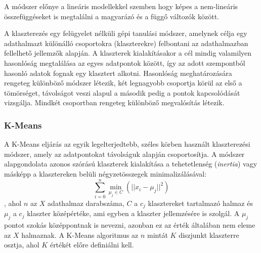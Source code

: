 A módszer előnye a lineáris modellekkel szemben hogy képes a nem-lineáris összefüggéseket is megtalálni a magyarázó és a függő változók között.





 \label{ssec:klaszterezes}
A klaszterezés egy felügyelet nélküli gépi tanulási módszer, amelynek célja egy adathalmazt különálló csoportokra (klaszterekre) felbontani az adathalmazban fellelhető jellemzők alapján. A klaszterek kialakításakor a cél mindig valamilyen hasonlóság megtalálása az egyes adatpontok között, így az adott szempontból hasonló adatok fognak egy klasztert alkotni. Hasonlóság meghatározására rengeteg különböző módszer létezik, két legnagyobb csoportja körül az első a tömörséget, távolságot veszi alapul a második pedig a pontok kapcsolódását vizsgálja. Mindkét csoportban rengeteg különböző megvalósítás létezik.

\subsubsection{K-Means}
A K-Means \cite{sklearn-kmeans} eljárás az egyik legelterjedtebb, széles körben használt klaszterezési módszer, amely az adatpontokat távolságuk alapján csoportosítja. A módszer alapgondolata azonos szórású klaszterek kialakítása a tehetetlenség (\textit{inertia}) vagy másképp a klasztereken belüli négyzetösszegek minimalizálásával:
$$\sum_{i=0}^{n} \min_{\mu_j \in C} (|| x_i - \mu_j ||^2)$$,
ahol $n$ az $X$ adathalmaz darabszáma, $C$ a $c_j$ klasztereket tartalmazó halmaz és $\mu_j$ a $c_j$ klaszter középértéke, ami egyben a klaszter jellemzésére is szolgál. A $\mu_j$ pontot szokás középpontnak is nevezni, azonban ez az érték általában nem eleme az $X$ halmaznak. A K-Means algoritmus az $n$ mintát $K$ diszjunkt klaszterre osztja, ahol $K$ értékét előre definiálni kell.

